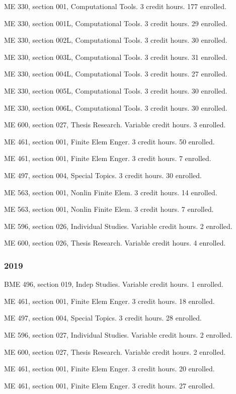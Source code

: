 \documentclass[
]{article}
\begin{document}
ME 330, section 001, Computational Tools. 3 credit hours. 177 enrolled.

ME 330, section 001L, Computational Tools. 3 credit hours. 29 enrolled.

ME 330, section 002L, Computational Tools. 3 credit hours. 30 enrolled.

ME 330, section 003L, Computational Tools. 3 credit hours. 31 enrolled.

ME 330, section 004L, Computational Tools. 3 credit hours. 27 enrolled.

ME 330, section 005L, Computational Tools. 3 credit hours. 30 enrolled.

ME 330, section 006L, Computational Tools. 3 credit hours. 30 enrolled.

ME 600, section 027, Thesis Research. Variable credit hours. 3 enrolled.

ME 461, section 001, Finite Elem Enger. 3 credit hours. 50 enrolled.

ME 461, section 001, Finite Elem Enger. 3 credit hours. 7 enrolled.

ME 497, section 004, Special Topics. 3 credit hours. 30 enrolled.

ME 563, section 001, Nonlin Finite Elem. 3 credit hours. 14 enrolled.

ME 563, section 001, Nonlin Finite Elem. 3 credit hours. 7 enrolled.

ME 596, section 026, Individual Studies. Variable credit hours. 2
enrolled.

ME 600, section 026, Thesis Research. Variable credit hours. 4 enrolled.

\subsubsection{2019}\label{section-5}

BME 496, section 019, Indep Studies. Variable credit hours. 1 enrolled.

ME 461, section 001, Finite Elem Enger. 3 credit hours. 18 enrolled.

ME 497, section 004, Special Topics. 3 credit hours. 28 enrolled.

ME 596, section 027, Individual Studies. Variable credit hours. 2
enrolled.

ME 600, section 027, Thesis Research. Variable credit hours. 2 enrolled.

ME 461, section 001, Finite Elem Enger. 3 credit hours. 20 enrolled.

ME 461, section 001, Finite Elem Enger. 3 credit hours. 27 enrolled.
\end{document}
